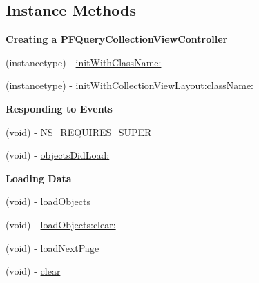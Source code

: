 \subsection*{Instance Methods}
\begin{Indent}{\bf Creating a P\+F\+Query\+Collection\+View\+Controller}\par
{\em 

 

 }\begin{DoxyCompactItemize}
\item 
(instancetype) -\/ \hyperlink{interface_p_f_query_collection_view_controller_a151cbbf61d89764271844f8cbe90a171}{init\+With\+Class\+Name\+:}
\item 
(instancetype) -\/ \hyperlink{interface_p_f_query_collection_view_controller_ab2e7e098f41e99bd7b787b5075814526}{init\+With\+Collection\+View\+Layout\+:class\+Name\+:}
\end{DoxyCompactItemize}
\end{Indent}
\begin{Indent}{\bf Responding to Events}\par
{\em 

 

 }\begin{DoxyCompactItemize}
\item 
(void) -\/ \hyperlink{interface_p_f_query_collection_view_controller_aaa83526611f039cce098da1f680b4ea7}{N\+S\+\_\+\+R\+E\+Q\+U\+I\+R\+E\+S\+\_\+\+S\+U\+P\+E\+R}
\item 
(void) -\/ \hyperlink{interface_p_f_query_collection_view_controller_a2a2bd8bb0697fc36f41a481ea96ceb63}{objects\+Did\+Load\+:}
\end{DoxyCompactItemize}
\end{Indent}
\begin{Indent}{\bf Loading Data}\par
{\em 

 

 }\begin{DoxyCompactItemize}
\item 
(void) -\/ \hyperlink{interface_p_f_query_collection_view_controller_a70df62cea5ae24a8a5f8200033c16e74}{load\+Objects}
\item 
(void) -\/ \hyperlink{interface_p_f_query_collection_view_controller_acdde1097806c5605ce4d5d950966995d}{load\+Objects\+:clear\+:}
\item 
(void) -\/ \hyperlink{interface_p_f_query_collection_view_controller_a5ab50cb4867b19a7b0f6b37a04eef8d4}{load\+Next\+Page}
\item 
(void) -\/ \hyperlink{interface_p_f_query_collection_view_controller_a80afde65d76220d0b26650a704db26ed}{clear}
\end{DoxyCompactItemize}
\end{Indent}
